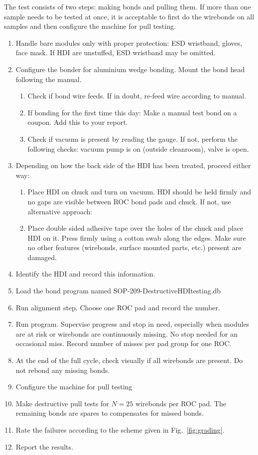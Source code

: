 \documentclass[10pt]{unlsilabsop}
\begin{document}
The test consists of two steps: making bonds and pulling them. If more than one sample needs to be tested at once, it is acceptable to first do the wirebonds on all samples and then configure the machine for pull testing.
\begin{enumerate}
    \item Handle bare modules only with proper protection: ESD wristband, gloves, face mask. If HDI are unstuffed, ESD wristband may be omitted.
    \item Configure the bonder for aluminium wedge bonding. Mount the bond head following the manual.
    \begin{enumerate}
	\item Check if bond wire feeds. If in doubt, re-feed wire according to manual.
	\item If bonding for the first time this day: Make a manual test bond on a coupon. Add this to your report.
	\item Check if vacuum is present by reading the gauge. If not, perform the following checks: vacuum pump is on (outside cleanroom), valve is open.
    \end{enumerate}
    \item Depending on how the back side of the HDI has been treated, proceed either way:
    \begin{enumerate}
	\item Place HDI on chuck and turn on vacuum. HDI should be held firmly and no gaps are visible between ROC bond pads and chuck. If not, use alternative approach:
	\item Place double sided adhesive tape over the holes of the chuck and place HDI on it. Press firmly using a cotton swab along the edges. Make sure no other features (wirebonds, surface mounted parts, etc.) present are damaged.
    \end{enumerate}
    \item Identify the HDI and record this information.
    \item Load the bond program named SOP-209-DestructiveHDItesting.db
    \item Run alignment step. Choose one ROC pad and record the number.
    \item Run program. Supervise progress and stop in need, especially when modules are at risk or wirebonds are continuously missing. No stop needed for an occasional miss. Record number of misses per pad group for one ROC.
    \item At the end of the full cycle, check visually if all wirebonds are present. Do not rebond any missing bonds.
    \item Configure the machine for pull testing
    \item Make destructive pull tests for $N=25$ wirebonds per ROC pad. The remaining bonds are spares to compensates for missed bonds.
    \item Rate the failures according to the scheme given in Fig.~\ref{fig:grading}.
    \item Report the results.
\end{enumerate}
\end{document}
